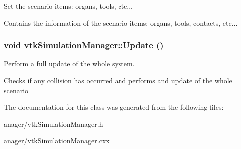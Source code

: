 Set the scenario items: organs, tools, etc... 

Contains the information of the scenario items: organs, tools, contacts, etc... \hypertarget{classvtkSimulationManager_a2d78cb22ac71b2e1e1f549c2df509a60}{
\subsubsection[{Update}]{\setlength{\rightskip}{0pt plus 5cm}void vtkSimulationManager::Update ()}}
\label{classvtkSimulationManager_a2d78cb22ac71b2e1e1f549c2df509a60}


Perform a full update of the whole system. 

Checks if any collision has occurred and performs and update of the whole scenario 

The documentation for this class was generated from the following files:\begin{DoxyCompactItemize}
\item 
anager/vtkSimulationManager.h\item 
anager/vtkSimulationManager.cxx\end{DoxyCompactItemize}
